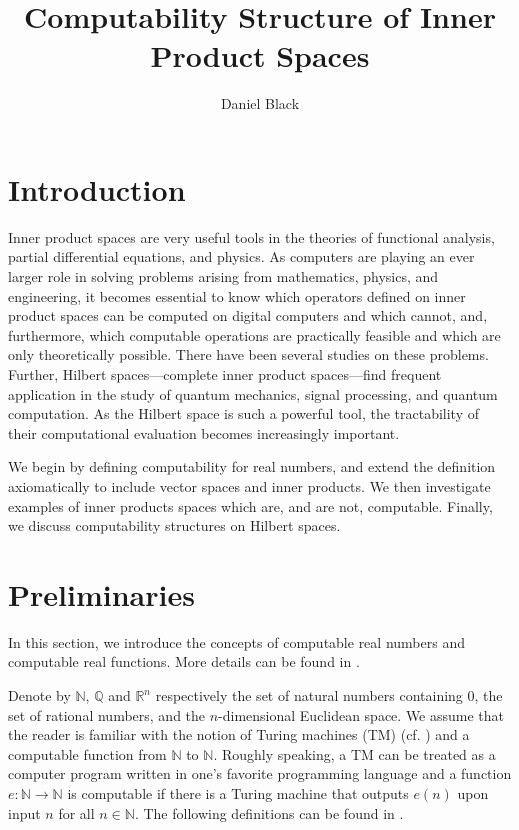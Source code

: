 \documentclass[a4paper,10pt]{article}
\title{Computability Structure of Inner Product Spaces}
\author{Daniel Black}
\begin{document}
\maketitle


\section{Introduction}
Inner product spaces are very useful tools in the theories of functional analysis, partial differential equations, and physics. As computers are playing an ever larger role in solving problems arising from mathematics, physics, and engineering, it becomes essential to know which operators defined on inner product spaces can be computed on digital computers and which cannot, and, furthermore, which computable operations are practically feasible and which are only theoretically possible. There have been several studies on these problems.  Further, Hilbert spaces---complete inner product spaces---find frequent application in the study of quantum mechanics, signal processing, and quantum computation.  As the Hilbert space is such a powerful tool, the tractability of their computational evaluation becomes increasingly important.

We begin by defining computability for real numbers, and extend the definition axiomatically to include vector spaces and inner products.  We then investigate examples of inner products spaces which are, and are not, computable.  Finally, we discuss computability structures on Hilbert spaces.

\section{Preliminaries}

In this section, we introduce the concepts of computable real numbers and computable real functions. More details can be found in \cite{PR89}.

Denote by $\mathbb{N}$, $\mathbb{Q}$ and $\mathbb{R}^n$ respectively the set of natural
numbers containing $0$, the set of rational numbers, and the $n$-dimensional Euclidean space. We assume that the reader is familiar
with the notion of Turing machines (TM) (cf. \cite{Tur36}) and a computable function from $\mathbb N$ to $\mathbb N$. Roughly speaking, a TM can
be treated as a computer program written in one's favorite programming language and a function $e:{\mathbb N}\to{\mathbb N}$ is computable if there is a Turing machine that outputs $e(n)$ upon input $n$ for all $n\in {\mathbb N}$. The following definitions can be found in \cite{PR89}.
\end{document}
